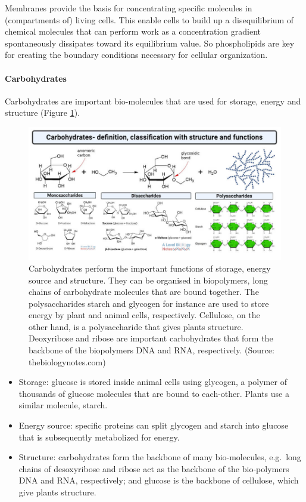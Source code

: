 \documentclass[
  11pt,
]{book}
\providecommand{\tightlist}{%
  \setlength{\itemsep}{0pt}\setlength{\parskip}{0pt}}
\begin{document}
Membranes provide the basis for concentrating specific molecules in (compartments of) living cells. This enable cells to build up a disequilibrium of chemical molecules that can perform work as a concentration gradient spontaneously dissipates toward its equilibrium value. So phospholipids are key for creating the boundary conditions necessary for cellular organization.

\hypertarget{carbohydrates}{%
\paragraph{Carbohydrates}\label{carbohydrates}}

Carbohydrates are important bio-molecules that are used for storage, energy and structure (Figure \ref{fig:carbohydrates}).

\begin{figure}

{\centering \includegraphics[width=1\linewidth]{./figs/Carbohydrates-definition-classification-with-structure-and-functions} 

}

\caption{Carbohydrates perform the important functions of storage, energy source and structure. They can be organised in biopolymers, long chains of carbohydrate molecules that are bound together. The polysaccharides starch and glycogen for instance are used to store energy by plant and animal cells, respectively. Cellulose, on the other hand, is a polysaccharide that gives plants structure. Deoxyribose and ribose are important carbohydrates that form the backbone of the biopolymers DNA and RNA, respectively. (Source: thebiologynotes.com)}\label{fig:carbohydrates}
\end{figure}

\begin{itemize}
\tightlist
\item
  Storage: glucose is stored inside animal cells using glycogen, a polymer of thousands of glucose molecules that are bound to each-other. Plants use a similar molecule, starch.
\item
  Energy source: specific proteins can split glycogen and starch into glucose that is subsequently metabolized for energy.
\item
  Structure: carbohydrates form the backbone of many bio-molecules, e.g.~long chains of desoxyribose and ribose act as the backbone of the bio-polymers DNA and RNA, respectively; and glucose is the backbone of cellulose, which give plants structure.
\end{itemize}
\end{document}
